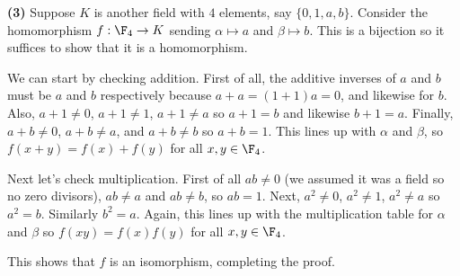 \textbf{(3)} Suppose $K$ is another field with $4$ elements, say $\{0,1,a,b\}$. Consider the homomorphism $f : \F_4 \to K$ sending $\alpha \mapsto a$ and $\beta \mapsto b$. This is a bijection so it suffices to show that it is a homomorphism. 

We can start by checking addition. First of all, the additive inverses of $a$ and $b$ must be $a$ and $b$ respectively because $a+a=(1+1)a=0$, and likewise for $b$. Also, $a+1\neq 0$, $a+1\neq 1$, $a+1\neq a$ so $a+1=b$ and likewise $b+1=a$. Finally, $a+b\neq 0$, $a+b\neq a$, and $a+b\neq b$ so $a+b=1$. This lines up with $\alpha$ and $\beta$, so $f(x+y)=f(x)+f(y)$ for all $x,y\in \F_4$.

Next let's check multiplication. First of all $ab\neq 0$ (we assumed it was a field so no zero divisors), $ab\neq a$ and $ab\neq b$, so $ab=1$. Next, $a^2\neq 0$, $a^2\neq 1$, $a^2\neq a$ so $a^2=b$. Similarly $b^2=a$. Again, this lines up with the multiplication table for $\alpha$ and $\beta$ so $f(xy)=f(x)f(y)$ for all $x,y\in \F_4$. 

This shows that $f$ is an isomorphism, completing the proof. 